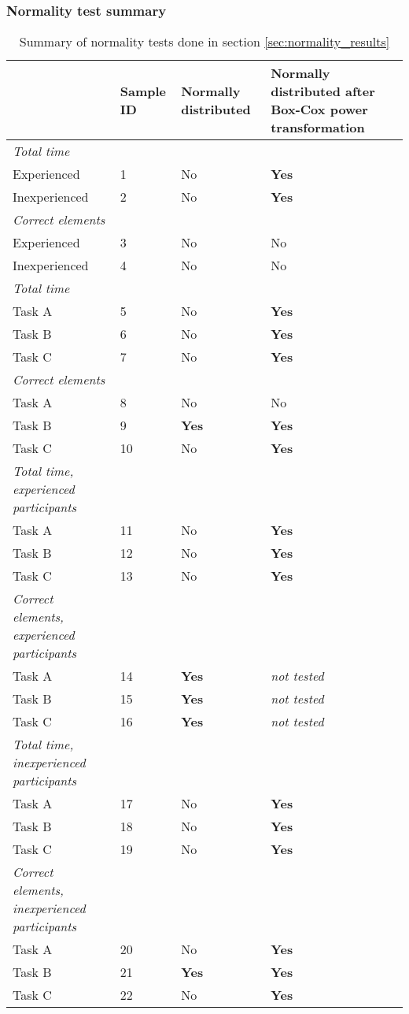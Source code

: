 \subsubsection{Normality test summary}\label{sec:normaltest_summary}

	\begin{longtable}{p{}|l|p{2cm}|p{}}
	\caption[Summary, normality tests]{Summary of normality tests done in section \ref{sec:normality_results}} \label{tab:normaltest_summary} \\
		  & Sample ID & Normally distributed  & Normally distributed after Box-Cox power transformation  \\ \hline
		\textit{Total time} & & & \\
		Experienced & 1 &No   & \textbf{Yes}   \\
		Inexperienced  & 2 & No & \textbf{Yes}     \\ \hline
		\textit{Correct elements} & & & \\
		Experienced & 3 & No  & No   \\
		Inexperienced  & 4 & No & No   \\ \hline
		\textit{Total time }& & & \\
		Task A & 5 &No  & \textbf{Yes}  \\
		Task B & 6 &No  & \textbf{Yes}   \\
		Task C & 7 & No & \textbf{Yes}  \\ \hline
		\textit{Correct elements} & & & \\
		Task A & 8 & No  & No  \\
		Task B & 9 &\textbf{Yes}  & \textbf{Yes}   \\
		Task C & 10 & No & \textbf{Yes}  \\ \hline
		\textit{Total time, experienced participants} & & & \\
		Task A & 11 & No  & \textbf{Yes}  \\
		Task B & 12 & No  & \textbf{Yes}   \\
		Task C & 13 & No & \textbf{Yes}  \\ \hline
		\textit{Correct elements, experienced participants} & & & \\
		Task A & 14 & \textbf{Yes}  & \textit{not tested} \\
		Task B & 15 & \textbf{Yes}  &  \textit{not tested} \\
		Task C & 16 & \textbf{Yes} & \textit{not tested} \\ \hline
		\textit{Total time, inexperienced participants} & & & \\
		Task A & 17& No  & \textbf{Yes}  \\
		Task B & 18 & No  & \textbf{Yes}   \\
		Task C & 19 & No & \textbf{Yes}  \\ \hline
		\textit{Correct elements, inexperienced participants} & & & \\
		Task A & 20 & No  & \textbf{Yes} \\
		Task B & 21 & \textbf{Yes}  & \textbf{Yes} \\
		Task C & 22 & No & \textbf{Yes} \\ \hline
	\end{longtable}


